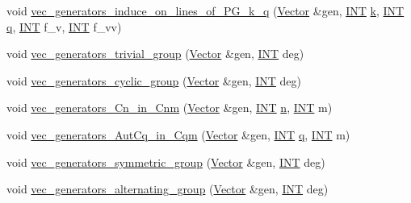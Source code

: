 \begin{DoxyCompactItemize}
\item 
void \mbox{\hyperlink{perm__group__gens_8_c_ab33fa2e167b2501e5761fee699b4c285}{vec\+\_\+generators\+\_\+induce\+\_\+on\+\_\+lines\+\_\+of\+\_\+\+P\+G\+\_\+k\+\_\+q}} (\mbox{\hyperlink{class_vector}{Vector}} \&gen, \mbox{\hyperlink{galois_8h_a09fddde158a3a20bd2dcadb609de11dc}{I\+NT}} \mbox{\hyperlink{simeon_8_c_a43fa990200c3ddd47c35f151bd4d66bf}{k}}, \mbox{\hyperlink{galois_8h_a09fddde158a3a20bd2dcadb609de11dc}{I\+NT}} \mbox{\hyperlink{simeon_8_c_a92cbb483a3b27ae1a0dbfcb125ce216f}{q}}, \mbox{\hyperlink{galois_8h_a09fddde158a3a20bd2dcadb609de11dc}{I\+NT}} f\+\_\+v, \mbox{\hyperlink{galois_8h_a09fddde158a3a20bd2dcadb609de11dc}{I\+NT}} f\+\_\+vv)
\item 
void \mbox{\hyperlink{perm__group__gens_8_c_ae405774a9bffab9b714a3da636bfde42}{vec\+\_\+generators\+\_\+trivial\+\_\+group}} (\mbox{\hyperlink{class_vector}{Vector}} \&gen, \mbox{\hyperlink{galois_8h_a09fddde158a3a20bd2dcadb609de11dc}{I\+NT}} deg)
\item 
void \mbox{\hyperlink{perm__group__gens_8_c_a87458d3ec3a12155abeb73c81bb3653c}{vec\+\_\+generators\+\_\+cyclic\+\_\+group}} (\mbox{\hyperlink{class_vector}{Vector}} \&gen, \mbox{\hyperlink{galois_8h_a09fddde158a3a20bd2dcadb609de11dc}{I\+NT}} deg)
\item 
void \mbox{\hyperlink{perm__group__gens_8_c_a1ac987f6157a88be8bee578587046082}{vec\+\_\+generators\+\_\+\+Cn\+\_\+in\+\_\+\+Cnm}} (\mbox{\hyperlink{class_vector}{Vector}} \&gen, \mbox{\hyperlink{galois_8h_a09fddde158a3a20bd2dcadb609de11dc}{I\+NT}} \mbox{\hyperlink{simeon_8_c_a7f2cd26777ce0ff3fdaf8d02aacbddfb}{n}}, \mbox{\hyperlink{galois_8h_a09fddde158a3a20bd2dcadb609de11dc}{I\+NT}} m)
\item 
void \mbox{\hyperlink{perm__group__gens_8_c_afd7b9d51a9afeae2685f3cae8b915ac4}{vec\+\_\+generators\+\_\+\+Aut\+Cq\+\_\+in\+\_\+\+Cqm}} (\mbox{\hyperlink{class_vector}{Vector}} \&gen, \mbox{\hyperlink{galois_8h_a09fddde158a3a20bd2dcadb609de11dc}{I\+NT}} \mbox{\hyperlink{simeon_8_c_a92cbb483a3b27ae1a0dbfcb125ce216f}{q}}, \mbox{\hyperlink{galois_8h_a09fddde158a3a20bd2dcadb609de11dc}{I\+NT}} m)
\item 
void \mbox{\hyperlink{perm__group__gens_8_c_a8fd875094f55682c6bf65d1fb5e6e2bc}{vec\+\_\+generators\+\_\+symmetric\+\_\+group}} (\mbox{\hyperlink{class_vector}{Vector}} \&gen, \mbox{\hyperlink{galois_8h_a09fddde158a3a20bd2dcadb609de11dc}{I\+NT}} deg)
\item 
void \mbox{\hyperlink{perm__group__gens_8_c_a34d3004f7ecbf30db1a05c884e130744}{vec\+\_\+generators\+\_\+alternating\+\_\+group}} (\mbox{\hyperlink{class_vector}{Vector}} \&gen, \mbox{\hyperlink{galois_8h_a09fddde158a3a20bd2dcadb609de11dc}{I\+NT}} deg)

\end{DoxyCompactItemize}
